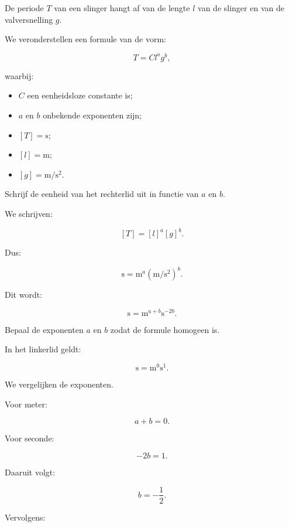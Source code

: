 \documentclass{ximera}
\begin{document}
\begin{oefening}{\oefG}

De periode $T$ van een slinger hangt af van de lengte $l$ van de slinger en van de valversnelling $g$.

We veronderstellen een formule van de vorm:

\[
T = C l^a g^b,
\]

waarbij:

\begin{itemize}
    \item $C$ een eenheidsloze constante is;
    \item $a$ en $b$ onbekende exponenten zijn;
    \item $[T]=\si{\second}$;
    \item $[l]=\si{\meter}$;
    \item $[g]=\si{\meter\per\second\squared}$.
\end{itemize}

\begin{question}
Schrijf de eenheid van het rechterlid uit in functie van $a$ en $b$.

\begin{oplossing}
We schrijven:

\[
[T]
=
[l]^a[g]^b.
\]

Dus:

\[
\si{\second}
=
\si{\meter}^a
\left(
\si{\meter\per\second\squared}
\right)^b.
\]

Dit wordt:

\[
\si{\second}
=
\si{\meter}^{a+b}
\si{\second}^{-2b}.
\]
\end{oplossing}
\end{question}


\begin{question}
Bepaal de exponenten $a$ en $b$ zodat de formule homogeen is.

\begin{oplossing}
In het linkerlid geldt:

\[
\si{\second}
=
\si{\meter}^{0}
\si{\second}^{1}.
\]

We vergelijken de exponenten.

Voor meter:

\[
a+b=0.
\]

Voor seconde:

\[
-2b=1.
\]

Daaruit volgt:

\[
b=-\frac{1}{2}.
\]

Vervolgens:


\end{oplossing}
\end{question}
\end{oefening}
\end{document}
